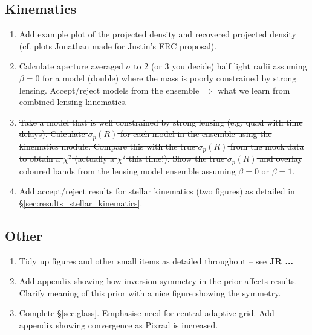\documentclass[galley,usenatbib]{mn2e}
\begin{document}
\subsection{Kinematics}

\begin{enumerate}

\item \sout{Add example plot of the projected density and recovered
  projected density (cf. plots Jonathan made for Justin's ERC
proposal).}

\item Calculate aperture averaged $\sigma$ to 2 (or 3 you decide) half
  light radii assuming $\beta = 0$ for a model (double) where the mass
  is poorly constrained by strong lensing. Accept/reject models from
  the ensemble $\Longrightarrow$ what we learn from combined lensing
  kinematics.

\item \sout{Take a model that is well constrained by strong lensing
  (e.g. quad with time delays). Calculate $\sigma_p(R)$ for each model
  in the ensemble using the kinematics module. Compare this with the
true $\sigma_p(R)$ from the mock data to obtain a $\chi^2$ (actually
  a $\chi^2$ this time!). Show the true $\sigma_p(R)$ and overlay
  coloured bands from the lensing model ensemble assuming $\beta = 0$
or $\beta = 1$.}

\item Add accept/reject results for stellar kinematics (two figures)
  as detailed in \S\ref{sec:results_stellar_kinematics}.

\end{enumerate}

\subsection{Other}

\begin{enumerate}

\item Tidy up figures and other small items as detailed throughout --
  see {\bf JR ... }

\item Add appendix showing how inversion symmetry in the prior affects
  results. Clarify meaning of this prior with a nice figure showing
  the symmetry.

\item Complete \S\ref{sec:glass}. Emphasise need for central adaptive
  grid. Add appendix showing convergence as Pixrad is increased.

\end{enumerate}
\end{document}
